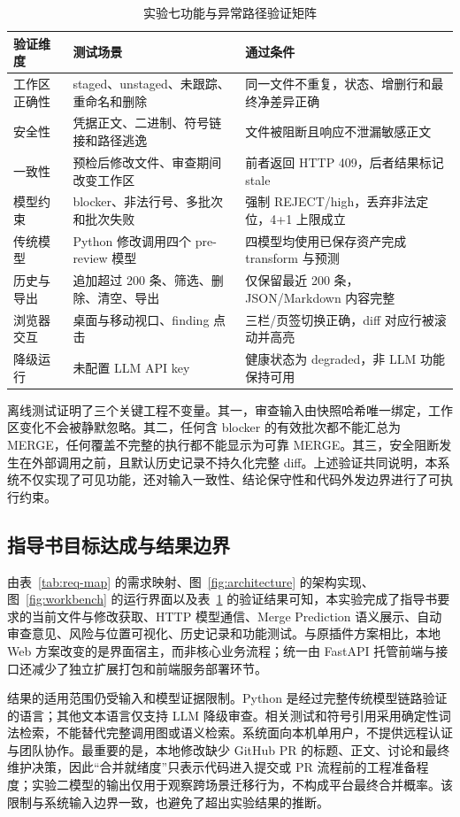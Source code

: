 \documentclass{experimentreport}
\begin{document}
{\begin{table}[H]
	\centering
	\caption{实验七功能与异常路径验证矩阵}
	\label{tab:verification}
	\small
	\begin{tabularx}{\textwidth}{p{3.2cm}X X}
		\toprule
		验证维度 & 测试场景 & 通过条件 \\
		\midrule
		工作区正确性 & staged、unstaged、未跟踪、重命名和删除 & 同一文件不重复，状态、增删行和最终净差异正确 \\
		安全性 & 凭据正文、二进制、符号链接和路径逃逸 & 文件被阻断且响应不泄漏敏感正文 \\
		一致性 & 预检后修改文件、审查期间改变工作区 & 前者返回 HTTP 409，后者结果标记 stale \\
		模型约束 & blocker、非法行号、多批次和批次失败 & 强制 REJECT/high，丢弃非法定位，4+1 上限成立 \\
		传统模型 & Python 修改调用四个 pre-review 模型 & 四模型均使用已保存资产完成 transform 与预测 \\
		历史与导出 & 追加超过 200 条、筛选、删除、清空、导出 & 仅保留最近 200 条，JSON/Markdown 内容完整 \\
		浏览器交互 & 桌面与移动视口、finding 点击 & 三栏/页签切换正确，diff 对应行被滚动并高亮 \\
		降级运行 & 未配置 LLM API key & 健康状态为 degraded，非 LLM 功能保持可用 \\
		\bottomrule
	\end{tabularx}
\end{table}

离线测试证明了三个关键工程不变量。其一，审查输入由快照哈希唯一绑定，工作区变化不会被静默忽略。其二，任何含 blocker 的有效批次都不能汇总为 MERGE，任何覆盖不完整的执行都不能显示为可靠 MERGE。其三，安全阻断发生在外部调用之前，且默认历史记录不持久化完整 diff。上述验证共同说明，本系统不仅实现了可见功能，还对输入一致性、结论保守性和代码外发边界进行了可执行约束。

\subsection{指导书目标达成与结果边界}

由表~\ref{tab:req-map} 的需求映射、图~\ref{fig:architecture} 的架构实现、图~\ref{fig:workbench} 的运行界面以及表~\ref{tab:verification} 的验证结果可知，本实验完成了指导书要求的当前文件与修改获取、HTTP 模型通信、Merge Prediction 语义展示、自动审查意见、风险与位置可视化、历史记录和功能测试。与原插件方案相比，本地 Web 方案改变的是界面宿主，而非核心业务流程；统一由 FastAPI 托管前端与接口还减少了独立扩展打包和前端服务部署环节。

结果的适用范围仍受输入和模型证据限制。Python 是经过完整传统模型链路验证的语言；其他文本语言仅支持 LLM 降级审查。相关测试和符号引用采用确定性词法检索，不能替代完整调用图或语义检索。系统面向本机单用户，不提供远程认证与团队协作。最重要的是，本地修改缺少 GitHub PR 的标题、正文、讨论和最终维护决策，因此“合并就绪度”只表示代码进入提交或 PR 流程前的工程准备程度；实验二模型的输出仅用于观察跨场景迁移行为，不构成平台最终合并概率。该限制与系统输入边界一致，也避免了超出实验结果的推断。

}
\end{document}
